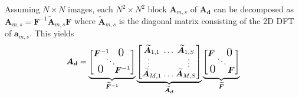 \documentclass{article}
\begin{document}
Assuming $N \times N$ images, each $N^2 \times N^2$ block $\bm A_{m,s}$ of $\bm
{A_d}$ can be decomposed as $\bm A_{m,s} = \bm F^{-1} \widetilde{\bm A}_{m,s}
\bm F$ where $\widetilde{\bm A}_{m,s}$ is the diagonal matrix consisting of the
2D DFT of $\bm a_{m,s}$. This yields
\vspace{-0.1 in}
\begin{equation}
  \bm {A_d}=
  \underbrace{
    \begin{bmatrix}
      \bm F^{-1} \hspace{-0.2 in}& \hspace{-0.2 in} & \hspace{-0.20 in} \vspace{-0.1 in}\text{\Large 0} \\
        \vspace{-0.05 in}& \ddots &  \\
      \text{\Large 0} \hspace{-0.17 in}& \hspace{-0.2 in} & \hspace{-0.15 in} \bm F^{-1}
    \end{bmatrix}
  }_{\widetilde{\bm F}^{-1}}
  \underbrace{
    \begin{bmatrix}
      \widetilde{\bm A}_{1,1} \hspace{-0.1 in}& \hdots & \hspace{-0.1 in} \widetilde{\bm A}_{1,S} \vspace{-0.02 in}\\
      \vspace{-0.02 in}\vdots & & \vdots \\
      \widetilde{\bm A}_{M,1} \hspace{-0.1 in}& \hdots & \hspace{-0.1 in} \widetilde{\bm A}_{M,S} \\
    \end{bmatrix}
  }_{\widetilde{\bm A}_{\bm d}}
  \underbrace{
    \begin{bmatrix}
      \bm F \hspace{-0.1 in}& \hspace{-0.2 in} & \hspace{-0.18 in} \vspace{-0.1 in}\text{\Large 0} \\
        \vspace{-0.05 in}& \ddots &  \\
      \text{\Large 0} \hspace{-0.15 in}& \hspace{-0.2 in} & \hspace{-0.12 in} \bm F
    \end{bmatrix}
  }_{\widetilde{\bm F}}
\label{eq:fourier_mtx}
\end{equation}
\vspace{-0.1 in}
\end{document}
